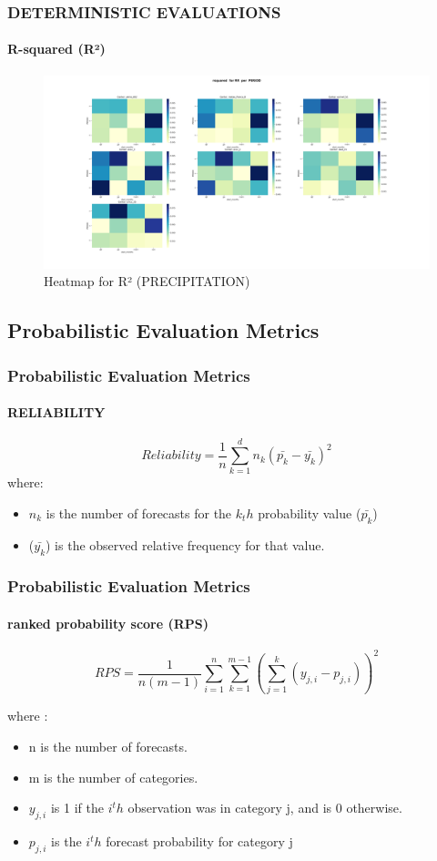 \begin{frame}
\frametitle{DETERMINISTIC EVALUATIONS}
\framesubtitle{R-squared (R²)}
\begin{figure}[H]
    \centering
    \includegraphics[width=1\linewidth]{rsquared_RR_ PERIOD.png}
    \caption{Heatmap for R² (PRECIPITATION)}
    \label{fig:rsquared-heatmap}
\end{figure}
\end{frame}


\subsection{Probabilistic Evaluation Metrics}


\begin{frame}
\frametitle{Probabilistic Evaluation Metrics}
\framesubtitle{RELIABILITY}

$$Reliability=\frac{1}{n} \sum\limits_{k=1}^{d} n_k(\bar{p_k}-\bar{y_k})^2$$
where:
\begin{itemize}
	\item $n_k$ is the number of forecasts for the $k_th$ probability value ($\bar{p_k}$)
	\item ($\bar{y_k}$) is the observed relative frequency for that value.
\end{itemize} 
\end{frame}




\begin{frame}
\frametitle{Probabilistic Evaluation Metrics}
\framesubtitle{ranked probability score (RPS)}


$$RPS=\frac{1}{n(m-1)}\sum\limits_{i=1}^{n} \sum\limits_{k=1}^{m-1} \left(\sum\limits_{j=1}^{k}(y_{j,i} - p_{j,i})\right)^2  $$

where : 

\begin{itemize}
	\item n is the number of forecasts.
	\item m is the number of categories.
	\item $y_{j,i}$ is 1 if the $i^th$ observation was in category j, and is 0 otherwise.
	\item $p_{j,i}$ is the $i^th$ forecast probability for category j
\end{itemize}
\end{frame}

